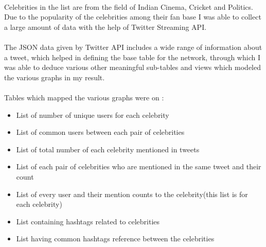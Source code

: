 \documentclass[runningheads,a4paper]{llncs}
\begin{document}
\paragraph{}Celebrities in the list are from the field of Indian Cinema, Cricket and Politics. Due to the popularity of the celebrities among their fan base I was able to collect a large amount of data with the help of Twitter Streaming API.

\paragraph{}
The JSON data given by Twitter API includes a wide range of information about a tweet, which helped in defining the base table for the network, through which I was able to deduce various other meaningful sub-tables and views which modeled the various graphs in my result.

\paragraph{}
Tables which mapped the various graphs were on :

\begin{itemize}

\item List of number of unique users for each celebrity

\item List of common users between each pair of celebrities

\item List of total number of each celebrity mentioned in tweets

\item List of each pair of celebrities who are mentioned in the same tweet and their count

\item List of every user and their mention counts to the celebrity(this list is for each celebrity)

\item List containing hashtags related to celebrities

\item List having common hashtags reference between the celebrities

\end{itemize}
\end{document}
